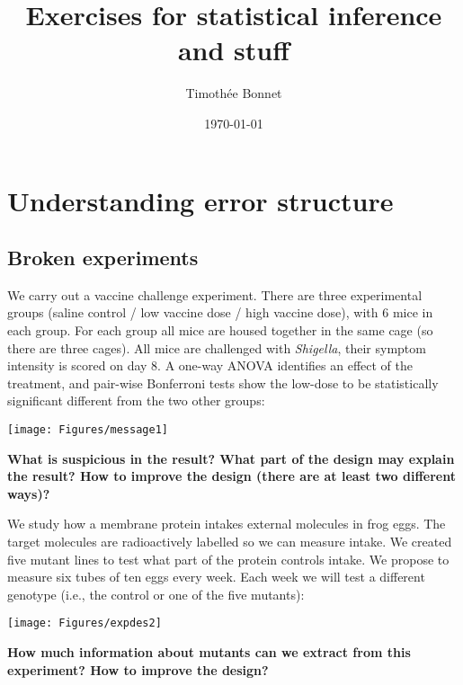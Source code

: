 \documentclass[12pt,a4paper]{scrartcl}\usepackage[]{graphicx}\usepackage[]{color}
\title{Exercises for statistical inference and stuff}
\date{\today}
\author{Timoth\'ee Bonnet}
\begin{document}
\maketitle

\tableofcontents
\ListOfExerciseInToc
{}

\clearpage

\section{Understanding error structure}

\subsection{Broken experiments}

\begin{Exercise}[difficulty=1, title={A significant result?}]
We carry out a vaccine challenge experiment. There are three experimental groups (saline control / low vaccine dose / high vaccine dose), with 6 mice in each group. For each group all mice are housed together in the same cage (so there are three cages). All mice are challenged with \emph{Shigella}, their symptom intensity is scored on day 8. A one-way ANOVA identifies an effect of the treatment, and pair-wise Bonferroni tests show the low-dose to be statistically significant different from the two other groups:

\texttt{[image: Figures/message1]}

\textbf{What is suspicious in the result? What part of the design may explain the result? How to improve the design (there are at least two different ways)?}
\end{Exercise}


\begin{Exercise}[difficulty=1, title={A better experimental design}]
We study how a membrane protein intakes external molecules in frog eggs. The target molecules are radioactively labelled so we can measure intake. We created five mutant lines to test what part of the protein controls intake. We propose to measure six tubes of ten eggs every week. Each week we will test a different genotype (i.e., the control or one of the five mutants):

\texttt{[image: Figures/expdes2]}

\textbf{How much information about mutants can we extract from this experiment? How to improve the design?}

\end{Exercise}
\end{document}
